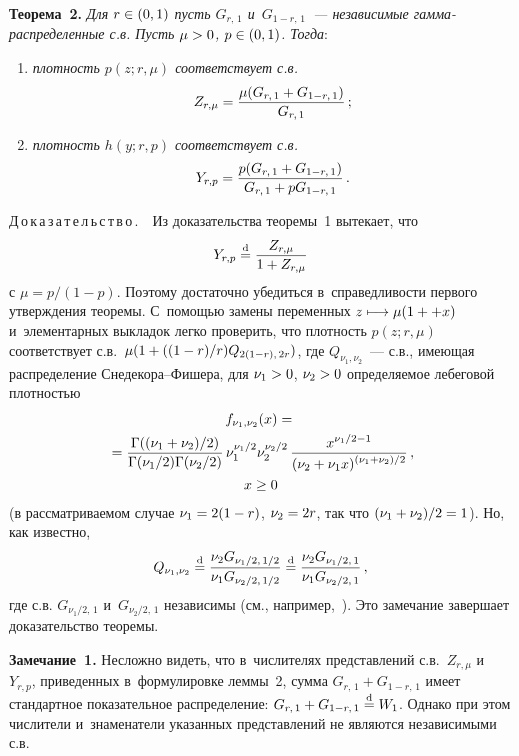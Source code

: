 \begin{multicols}{2}
\smallskip

\noindent
\textbf{Теорема~2.} \textit{Для $r\hm\in(0,1)$ пусть $G_{r,\,1}$ 
и~$G_{1-r,\,1}$~--- независимые гам\-ма-рас\-пре\-де\-лен\-ные с.в. Пусть
$\mu\hm>0$, $p\hm\in(0,1)$. Тогда}:
\begin{enumerate}[($i$)]
\item \textit{плотность $p(z;r,\mu)$ соответствует с.в.}
$$
Z_{r,\mu}=\displaystyle\frac{\displaystyle \mu(G_{r,\,1}+G_{1-r,\,1})\mathstrut}{\displaystyle G_{r,\,1}\mathstrut}\,;
$$

\item \textit{плотность $h(y;r,p)$ соответствует с.в.}
$$
Y_{r,p}=\displaystyle\frac{\displaystyle p(G_{r,\,1}+G_{1-r,\,1})\mathstrut}{\displaystyle G_{r,\,1}+pG_{1-r,\,1}\mathstrut}\,.
$$
\end{enumerate}

\smallskip

\noindent
Д\,о\,к\,а\,з\,а\,т\,е\,л\,ь\,с\,т\,в\,о\,.\ \ 
Из доказательства теоремы~1 вытекает, что
$$
Y_{r,p}\stackrel{\mathrm{d}}{=}\displaystyle\frac{\displaystyle Z_{r,\mu}\mathstrut}{\displaystyle 1+Z_{r,\mu}\mathstrut}
$$
с $\mu=p/(1-p)$. Поэтому достаточно убедиться в~справедливости
первого утверждения теоре\-мы. С~по\-мощью замены переменных
$z\longmapsto \mu(1+\linebreak + x)$ и~элементарных выкладок легко проверить, что
плотность $p(z;r,\mu)$ соответствует с.в.\
$\mu(1\hm+(({1-r})/{r})Q_{2(1-r),\,2r})$, где $Q_{\nu_1,\nu_2}$~--- 
с.в., име\-ющая распределение Сне\-де\-ко\-ра--Фи\-ше\-ра, для $\nu_1\hm>0$,
$\nu_2\hm>0$ определяемое лебеговой плот\-ностью
\begin{multline*}
f_{\nu_1,\nu_2}(x)={}\\
{}=\displaystyle\frac{\displaystyle \Gamma(({\nu_1+\nu_2})/{2})\mathstrut}{\displaystyle \Gamma({\nu_1}/{2})
\Gamma({\nu_2}/{2})\mathstrut}\,
\nu_1^{\nu_1/2}\nu_2^{\nu_2/2}\,
\displaystyle\frac{\displaystyle x^{\nu_1/2-1}\mathstrut}{\displaystyle (\nu_2+\nu_1x)^{(\nu_1+\nu_2)/2}\mathstrut}\,,\\
x\ge0
\end{multline*}
(в рассматриваемом случае $\nu_1\hm=2(1\hm-r)$, $\nu_2\hm=2r$, так что
$(\nu_1\hm+\nu_2)/2\hm=1$). Но, как известно,
$$
Q_{\nu_1,\nu_2}\stackrel{\mathrm{d}}{=}\displaystyle\frac{\displaystyle \nu_2 G_{\nu_1/2,\,1/2}\mathstrut}{\displaystyle \nu_1
G_{\nu_2/2,\,1/2}\mathstrut}\stackrel{\mathrm{d}}{=}\displaystyle\frac{\displaystyle \nu_2 G_{\nu_1/2,\,1}\mathstrut}{\displaystyle \nu_1
G_{\nu_2/2,\,1}\mathstrut}\,,
$$
где с.в. $G_{\nu_1/2,\,1}$ и~$G_{\nu_2/2,\,1}$ независимы (см.,
например,~\cite[с.~32]{Bolshev}). Это замечание завершает
доказательство теоремы.

\smallskip

\noindent
\textbf{Замечание~1.} Несложно видеть, что в~числителях представлений
с.в.~$Z_{r,\mu}$ и~$Y_{r,p}$, приведенных в~формулировке леммы~2,
сумма $G_{r,\,1}+G_{1-r,\,1}$ имеет стандартное показательное
распределение: $G_{r,\,1}+G_{1-r,\,1}\stackrel{\mathrm{d}}{=} W_1$. Однако при этом
числители и~знаменатели указанных представлений не являются
независимыми с.в.


\end{multicols}
